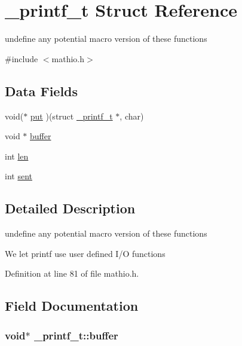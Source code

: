 \hypertarget{struct__printf__t}{}\section{\+\_\+printf\+\_\+t Struct Reference}
\label{struct__printf__t}


undefine any potential macro version of these functions  




{\ttfamily \#include $<$mathio.\+h$>$}

\subsection*{Data Fields}
\begin{DoxyCompactItemize}
\item 
void($\ast$ \hyperlink{struct__printf__t_a3ef8eb0143b93d4446b04c6ce9313be7}{put} )(struct \hyperlink{struct__printf__t}{\+\_\+printf\+\_\+t} $\ast$, char)
\item 
void $\ast$ \hyperlink{struct__printf__t_ad35884151d0be6667caafad8caacc76f}{buffer}
\item 
int \hyperlink{struct__printf__t_a5139902cde74159b79e6418a34712bee}{len}
\item 
int \hyperlink{struct__printf__t_a872716fd701166cd57bd3fffb7b77706}{sent}
\end{DoxyCompactItemize}


\subsection{Detailed Description}
undefine any potential macro version of these functions 

We let printf use user defined I/O functions 

Definition at line 81 of file mathio.\+h.



\subsection{Field Documentation}
\subsubsection[{\texorpdfstring{buffer}{buffer}}]{\setlength{\rightskip}{0pt plus 5cm}void$\ast$ \+\_\+printf\+\_\+t\+::buffer}\hypertarget{struct__printf__t_ad35884151d0be6667caafad8caacc76f}{}\label{struct__printf__t_ad35884151d0be6667caafad8caacc76f}


